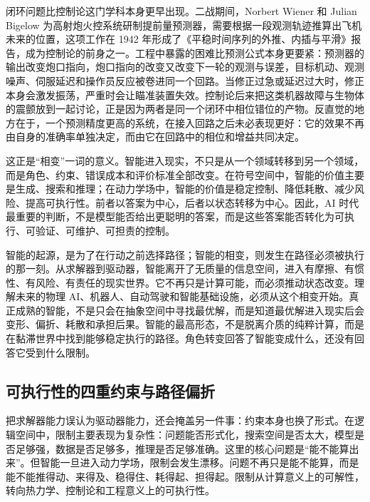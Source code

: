 闭环问题比控制论这门学科本身更早出现。二战期间，Norbert Wiener 和 Julian Bigelow 为高射炮火控系统研制提前量预测器，需要根据一段观测轨迹推算出飞机未来的位置，这项工作在 1942 年形成了《平稳时间序列的外推、内插与平滑》报告，成为控制论的前身之一\cite{wiener1948}。工程中暴露的困难比预测公式本身更要紧：预测器的输出改变炮口指向，炮口指向的改变又改变下一轮的观测与误差，目标机动、观测噪声、伺服延迟和操作员反应被卷进同一个回路。当修正过急或延迟过大时，修正本身会激发振荡，严重时会让瞄准装置失效。控制论后来把这类机器故障与生物体的震颤放到一起讨论，正是因为两者是同一个闭环中相位错位的产物。反直觉的地方在于，一个预测精度更高的系统，在接入回路之后未必表现更好：它的效果不再由自身的准确率单独决定，而由它在回路中的相位和增益共同决定。

这正是“相变”一词的意义。智能进入现实，不只是从一个领域转移到另一个领域，而是角色、约束、错误成本和评价标准全部改变。在符号空间中，智能的价值主要是生成、搜索和推理；在动力学场中，智能的价值是稳定控制、降低耗散、减少风险、提高可执行性。前者以答案为中心，后者以状态转移为中心。因此，AI 时代最重要的判断，不是模型能否给出更聪明的答案，而是这些答案能否转化为可执行、可验证、可维护、可担责的控制。

智能的起源，是为了在行动之前选择路径；智能的相变，则发生在路径必须被执行的那一刻。从求解器到驱动器，智能离开了无质量的信息空间，进入有摩擦、有惯性、有风险、有责任的现实世界。它不再只是计算可能，而必须推动状态改变。理解未来的物理 AI、机器人、自动驾驶和智能基础设施，必须从这个相变开始。真正成熟的智能，不是只会在抽象空间中寻找最优解，而是知道最优解进入现实后会变形、偏折、耗散和承担后果。智能的最高形态，不是脱离介质的纯粹计算，而是在黏滞世界中找到能够稳定执行的路径。角色转变回答了智能变成什么，还没有回答它受到什么限制。

\subsection{可执行性的四重约束与路径偏折}

把求解器能力误认为驱动器能力，还会掩盖另一件事：约束本身也换了形式。在逻辑空间中，限制主要表现为复杂性：问题能否形式化，搜索空间是否太大，模型是否足够强，数据是否足够多，推理是否足够准确。这里的核心问题是“能不能算出来”。但智能一旦进入动力学场，限制会发生漂移。问题不再只是能不能算，而是能不能推得动、来得及、稳得住、耗得起、担得起。限制从计算意义上的可解性，转向热力学、控制论和工程意义上的可执行性。


